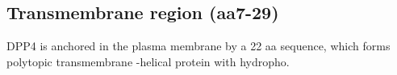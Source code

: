 \subsection{Transmembrane region (aa7-29)}

DPP4 is anchored in the plasma membrane by a 22 aa sequence, which forms polytopic transmembrane \alpha-helical protein with hydropho. \cite{Hong_1990}